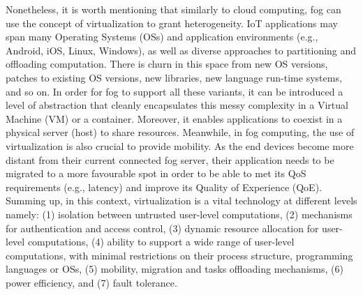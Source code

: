 \noindent\tab Nonetheless, it is worth mentioning that similarly to cloud computing, fog can use the concept of virtualization to grant heterogeneity. IoT applications may span many Operating Systems (OSs) and application environments (e.g., Android, iOS, Linux, Windows), as well as diverse approaches to partitioning and offloading computation. There is churn in this space from new OS versions, patches to existing OS versions, new libraries, new language run-time systems, and so on. In order for fog to support all these variants, it can be introduced a level of abstraction that cleanly encapsulates this messy complexity in a Virtual Machine (VM) or a container. Moreover, it enables applications to coexist in a physical server (host) to share resources. Meanwhile, in fog computing, the use of virtualization is also crucial to provide mobility. As the end devices become more distant from their current connected fog server, their application needs to be migrated to a more favourable spot in order to be able to met its QoS requirements (e.g., latency) and improve its Quality of Experience (QoE).\\
\noindent\tab Summing up, in this context, virtualization is a vital technology at different levels namely: (1) isolation between untrusted user-level computations, (2) mechanisms for authentication and access control, (3) dynamic resource allocation for user-level computations, (4) ability to support a wide range of user-level computations, with minimal restrictions on their process structure, programming languages or OSs, (5) mobility, migration and tasks offloading mechanisms, (6) power efficiency, and (7) fault tolerance.\\
